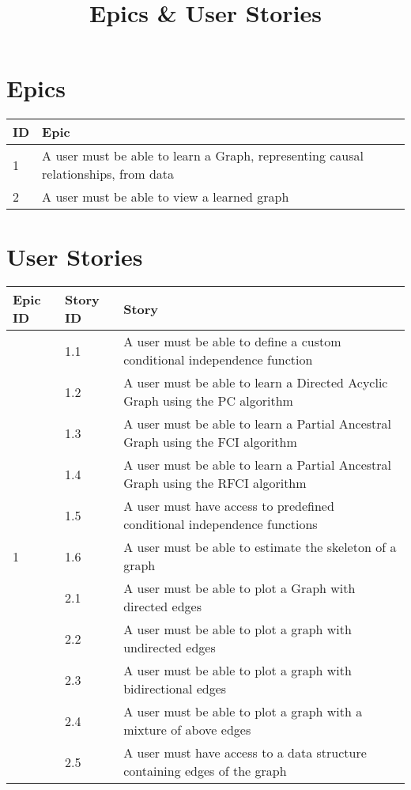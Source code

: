 \documentclass{article}
\begin{document}
\title{Epics \& User Stories}
\date{}
\maketitle
\section{Epics}
\begin{tabular}{| l | p{12cm} |}
	\hline	
	ID & Epic \\
	\hline
	1 & A user must be able to learn a Graph, representing causal relationships, from data \\
	\hline
	2 & A user must be able to view a learned graph \\
	\hline
\end{tabular}

\section{User Stories}

\begin{tabular}{| l | l | p{9.5cm} |}
	\hline
	Epic ID & Story ID & Story \\
	\hline
	\multirow{11}{*}{1} & 1.1 & A user must be able to define a custom conditional independence  function\\
	\cline{2-3}
	& 1.2 & A user  must be able to learn a Directed Acyclic Graph using  the PC algorithm \\
	\cline{2-3}
	& 1.3 & A user  must be able to learn a Partial  Ancestral Graph using  the FCI algorithm \\
	\cline{2-3}
	& 1.4 & A user  must be able to learn a Partial  Ancestral Graph using  the RFCI algorithm \\
	\cline{2-3}
	& 1.5 & A user must have access to predefined conditional independence functions \\
	\cline{2-3}
	& 1.6 & A user must be able to estimate the skeleton of a graph \\
	\hline
	\multirow{7}{*}{2} & 2.1 & A user must be able to plot a Graph with directed edges\\
	\cline{2-3}
	& 2.2 & A user  must be able to plot a graph with undirected edges \\
	\cline{2-3}
	& 2.3 & A user must be able to plot a graph with bidirectional edges \\
	\cline{2-3}
	& 2.4 & A user must be able to plot a graph with a mixture of above edges \\
	\cline{2-3}
	& 2.5 & A user must have access to a data structure containing edges of the graph \\
	\hline
	 
\end{tabular}
\end{document}
